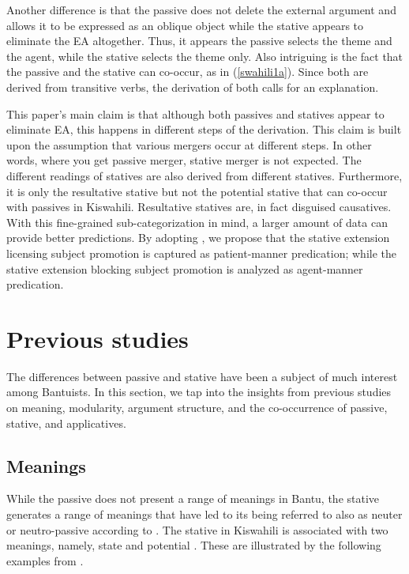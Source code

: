 \documentclass[output=paper]{langscibook}
\begin{document}
Another difference is that the passive does not delete the external argument and allows it to be expressed as an oblique object while the stative appears to eliminate the EA altogether. Thus, it appears the passive selects the theme and the agent, while the stative selects the theme only. Also intriguing is the fact that the passive and the stative can co-occur, as in (\ref{swahili1a}). Since both are derived from transitive verbs, the derivation of both calls for an explanation. 

This paper's main claim is that although both passives and statives appear to eliminate EA, this happens in different steps of the derivation. This claim is built upon the assumption that various mergers occur at different steps. In other words, where you get passive merger, stative merger is not expected. The different readings of statives are also derived from different statives. Furthermore, it is only the resultative stative but not the potential stative that can co-occur with passives in Kiswahili. Resultative statives are, in fact disguised causatives. With this fine-grained sub-categorization in mind, a larger amount of data can provide better predictions. By adopting \citet{Hale:2002aa}, we propose that the stative extension licensing subject promotion is captured as patient-manner predication; while the stative extension blocking subject promotion is analyzed as agent-manner predication. 
 
\section{Previous studies}
The differences between passive and stative have been a subject of much interest among Bantuists. In this section, we tap into the insights from previous studies on meaning, modularity,  argument structure, and the co-occurrence of passive, stative, and applicatives. 

\subsection{Meanings}
While the passive does not present a range of meanings in Bantu, the stative generates a range of meanings that have led to its being referred to also as neuter or neutro-passive according to \citet[179]{8603069}. The stative in Kiswahili is associated with two meanings, namely, state and potential \citep{Ashton-1947,Polome-nd,8603069}. These are illustrated by the following examples from \citet[227--228]{Ashton-1947}.
\end{document}
